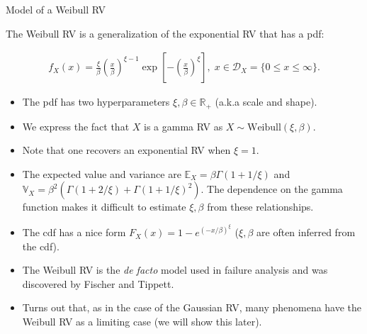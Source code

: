 \documentclass[9pt]{beamer}
\begin{document}
%
\begin{frame}{Model of a Weibull RV}

The Weibull RV is a generalization of the exponential RV that has a pdf:
\begin{block}{}
\begin{align*}
f_X(x)=\frac{\xi}{\beta}\left(\frac{x}{\beta}\right)^{\xi-1}\exp\left[{-\left(\frac{x}{\beta}\right)^\xi}\right],\; x\in \mathcal{D}_X=\{0\leq x\leq \infty\}.
\end{align*}
\end{block}
\begin{itemize}
\item The pdf has two hyperparameters $\xi,\beta\in \mathbb{R}_+$ (a.k.a scale and shape).
\item We express the fact that $X$ is a gamma RV as $X\sim \textrm{Weibull}(\xi,\beta)$.
\item Note that one recovers an exponential RV when $\xi=1$. 
\item The expected value and variance are $\mathbb{E}_X=\beta\Gamma(1+1/\xi)$ and $\mathbb{V}_X=\beta^2\left(\Gamma(1+2/\xi)+\Gamma(1+1/\xi)^2\right)$. The dependence on the gamma function makes it difficult to estimate $\xi,\beta$ from these relationships. 
\item The cdf has a nice form $F_X(x)=1-e^{(-x/\beta)^\xi}$ ($\xi,\beta$ are often inferred from the cdf). 
\item The Weibull RV is the {\em de facto} model used in failure analysis and was discovered by Fischer and Tippett. 
\item Turns out that, as in the case of the Gaussian RV, many phenomena have the Weibull RV as a limiting case (we will show this later). 
\end{itemize}

\end{frame}
\end{document}
